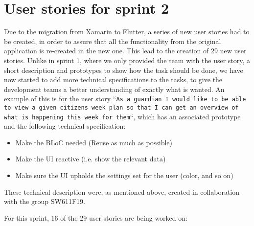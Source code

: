 \section{User stories for sprint 2}
Due to the migration from Xamarin to Flutter, a series of new user stories had to be created, in order to assure that all the functionality from the original application is re-created in the new one.
This lead to the creation of 29 new user stories.
Unlike in sprint 1, where we only provided the team with the user story, a short description and prototypes to show how the task should be done, we have now started to add more technical specifications to the tasks, to give the development teams a better understanding of exactly what is wanted.
An example of this is for the user story ``\texttt{As a guardian I would like to be able to view a given citizens week plan so that I can get an overview of what is happening this week for them}``, which has an associated prototype and the following technical specification:

\begin{itemize}
    \item Make the BLoC needed (Reuse as much as possible)
    \item Make the UI reactive (i.e. show the relevant data)
    \item Make sure the UI upholds the settings set for the user (color, and so on)
\end{itemize}
These technical description were, as mentioned above, created in collaboration with the group SW611F19.

\noindent
For this sprint, 16 of the 29 user stories are being worked on:


